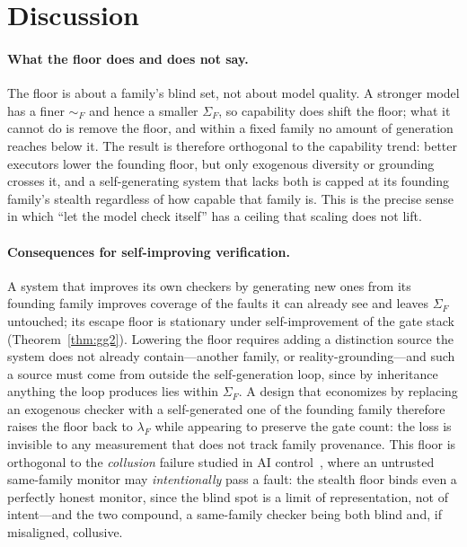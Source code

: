 \documentclass[11pt]{article}
\theoremstyle{definition}
\theoremstyle{remark}
\newcommand{\simF}{\sim_{F}}
\newcommand{\SigF}{\Sigma_{F}}
\newcommand{\lF}{\lambda_{F}}
\begin{document}
\section{Discussion}\label{sec:disc}

\paragraph{What the floor does and does not say.}
The floor is about a family's blind set, not about model quality. A stronger model has a finer
$\simF$ and hence a smaller $\SigF$, so capability does shift the floor; what it cannot do is remove
the floor, and within a fixed family no amount of generation reaches below it. The result is therefore
orthogonal to the capability trend: better executors lower the founding floor, but only exogenous
diversity or grounding crosses it, and a self-generating system that lacks both is capped at its
founding family's stealth regardless of how capable that family is. This is the precise sense in which
``let the model check itself'' has a ceiling that scaling does not lift.

\paragraph{Consequences for self-improving verification.}
A system that improves its own checkers by generating new ones from its founding family improves
coverage of the faults it can already see and leaves $\SigF$ untouched; its escape floor is stationary
under self-improvement of the gate stack (Theorem~\ref{thm:gg2}). Lowering the floor requires adding a
distinction source the system does not already contain---another family, or reality-grounding---and
such a source must come from outside the self-generation loop, since by inheritance anything the loop
produces lies within $\SigF$. A design that economizes by replacing an exogenous checker with a
self-generated one of the founding family therefore raises the floor back to $\lF$ while appearing
to preserve the gate count: the loss is invisible to any measurement that does not track family
provenance. This floor is orthogonal to the \emph{collusion} failure studied in AI
control~\cite{greenblatt2024}, where an untrusted same-family monitor may \emph{intentionally} pass a
fault: the stealth floor binds even a perfectly honest monitor, since the blind spot is a limit of
representation, not of intent---and the two compound, a same-family checker being both blind and, if
misaligned, collusive.
\end{document}
